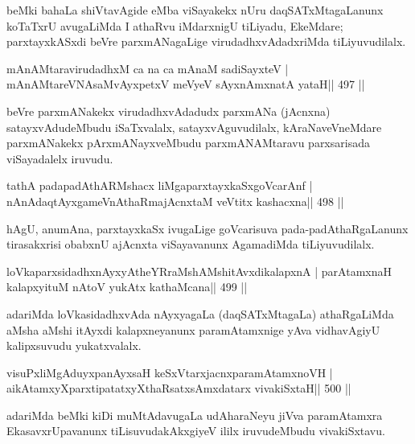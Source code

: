 \begin{artha}
beMki bahaLa shiVtavAgide eMba viSayakekx nUru daqSATxMtagaLanunx koTaTxrU avugaLiMda I athaRvu iMdarxnigU tiLiyadu, EkeMdare; parxtayxkASxdi beVre parxmANagaLige virudadhxvAdadxriMda tiLiyuvudilalx.
\end{artha}

\begin{shl}
mAnAMtaravirudadhxM ca na ca mAnaM sadiSayxteV |
mAnAMtareVNAsaMvAyxpetxV meVyeV sAyxnAmxnatA yataH\hfill || 497 ||
\end{shl}

\begin{artha}
beVre parxmANakekx virudadhxvAdadudx parxmANa (jAcnxna) satayxvAdudeMbudu iSaTxvalalx, satayxvAguvudilalx, kAraNaveVneMdare parxmANakekx pArxmANayxveMbudu parxmANAMtaravu parxsarisada viSayadalelx iruvudu.
\end{artha}

\begin{shl}
tathA padapadAthARMshacx liMgaparxtayxkaSxgoVcarAnf |
nAnAdaqtAyx\s\s gameVnAthaRmajAcnxtaM veVtitx kashacxna\hfill || 498 ||
\end{shl}

\begin{artha}
hAgU, anumAna, parxtayxkaSx ivugaLige goVcarisuva pada-padAthaRgaLanunx tirasakxrisi obabxnU ajAcnxta viSayavanunx AgamadiMda tiLiyuvudilalx.
\end{artha}

\begin{shl}
loVkaparxsidadhxnAyxyAtheYRraMshAMshitAvxdikalapxnA |
parAtamxnaH kalapxyituM nAtoV yukAtx kathaMcana\hfill || 499 ||
\end{shl}

\begin{artha}
adariMda loVkasidadhxvAda nAyxyagaLa (daqSATxMtagaLa) athaRgaLiMda aMsha aMshi itAyxdi kalapxneyanunx paramAtamxnige yAva vidhavAgiyU kalipxsuvudu yukatxvalalx.
\end{artha}



\begin{shl}
visuPxliMgAduyxpanAyxsaH keSxVtarxjacnxparamAtamxnoVH |
aikAtamxyXparxtipatatxyXthaRsatxsAmxdatarx vivakiSxtaH\hfill || 500 ||
\end{shl}

\begin{artha}
adariMda beMki kiDi muMtAdavugaLa udAharaNeyu jiVva paramAtamxra EkasavxrUpavanunx tiLisuvudakAkxgiyeV ililx iruvudeMbudu vivakiSxtavu.
\end{artha}

